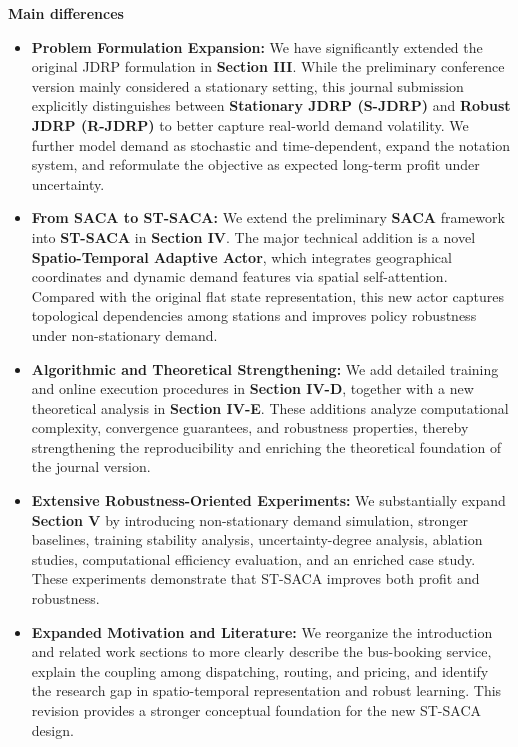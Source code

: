 \documentclass[11pt, a4paper]{article}
\begin{document}
\noindent \textbf{Main differences}
\vspace{-1em}
\begin{itemize}
    \item[a)] \textbf{Problem Formulation Expansion:} We have significantly extended the original JDRP formulation in \textbf{Section III}. While the preliminary conference version mainly considered a stationary setting, this journal submission explicitly distinguishes between \textbf{Stationary JDRP (S-JDRP)} and \textbf{Robust JDRP (R-JDRP)} to better capture real-world demand volatility. We further model demand as stochastic and time-dependent, expand the notation system, and reformulate the objective as expected long-term profit under uncertainty.

    \item[b)] \textbf{From SACA to ST-SACA:} We extend the preliminary \textbf{SACA} framework into \textbf{ST-SACA} in \textbf{Section IV}. The major technical addition is a novel \textbf{Spatio-Temporal Adaptive Actor}, which integrates geographical coordinates and dynamic demand features via spatial self-attention. Compared with the original flat state representation, this new actor captures topological dependencies among stations and improves policy robustness under non-stationary demand.

    \item[c)] \textbf{Algorithmic and Theoretical Strengthening:} We add detailed training and online execution procedures in \textbf{Section IV-D}, together with a new theoretical analysis in \textbf{Section IV-E}. These additions analyze computational complexity, convergence guarantees, and robustness properties, thereby strengthening the reproducibility and enriching the theoretical foundation of the journal version.

    \item[d)] \textbf{Extensive Robustness-Oriented Experiments:} We substantially expand \textbf{Section V} by introducing non-stationary demand simulation, stronger baselines, training stability analysis, uncertainty-degree analysis, ablation studies, computational efficiency evaluation, and an enriched case study. These experiments demonstrate that ST-SACA improves both profit and robustness.

    \item[e)] \textbf{Expanded Motivation and Literature:} We reorganize the introduction and related work sections to more clearly describe the bus-booking service, explain the coupling among dispatching, routing, and pricing, and identify the research gap in spatio-temporal representation and robust learning. This revision provides a stronger conceptual foundation for the new ST-SACA design.
\end{itemize}
\end{document}
